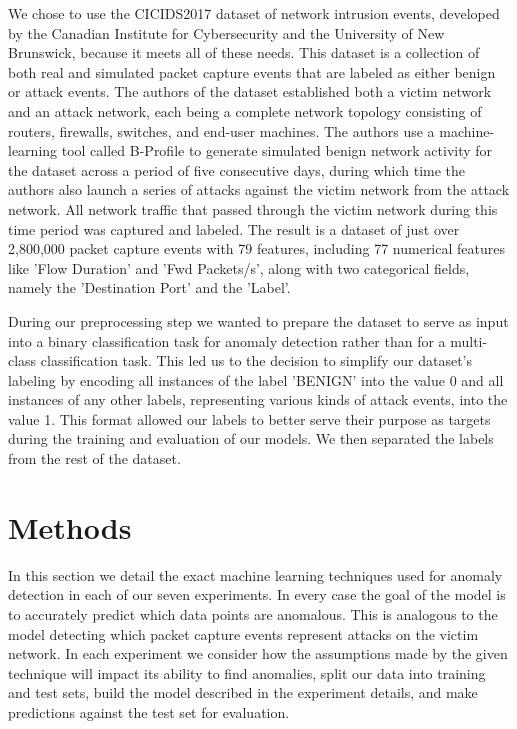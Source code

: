 \documentclass[conference]{IEEEtran}
\begin{document}
We chose to use the CICIDS2017 dataset of network intrusion events, developed by the Canadian Institute for Cybersecurity and the University of New Brunswick, because it meets all of these needs. This dataset is a collection of both real and simulated packet capture events that are labeled as either benign or attack events. The authors of the dataset established both a victim network and an attack network, each being a complete network topology consisting of routers, firewalls, switches, and end-user machines. The authors use a machine-learning tool called B-Profile to generate simulated benign network activity for the dataset across a period of five consecutive days, during which time the authors also launch a series of attacks against the victim network from the attack network. All network traffic that passed through the victim network during this time period was captured and labeled. The result is a dataset of just over 2,800,000 packet capture events with 79 features, including 77 numerical features like 'Flow Duration' and 'Fwd Packets/s', along with two categorical fields, namely the 'Destination Port' and the 'Label'.

During our preprocessing step we wanted to prepare the dataset to serve as input into a binary classification task for anomaly detection rather than for a multi-class classification task. This led us to the decision to simplify our dataset's labeling by encoding all instances of the label 'BENIGN' into the value 0 and all instances of any other labels, representing various kinds of attack events, into the value 1. This format allowed our labels to better serve their purpose as targets during the training and evaluation of our models. We then separated the labels from the rest of the dataset.

\section{Methods}

In this section we detail the exact machine learning techniques used for anomaly detection in each of our seven experiments. In every case the goal of the model is to accurately predict which data points are anomalous. This is analogous to the model detecting which packet capture events represent attacks on the victim network. In each experiment we consider how the assumptions made by the given technique will impact its ability to find anomalies, split our data into training and test sets, build the model described in the experiment details, and make predictions against the test set for evaluation.
\end{document}
